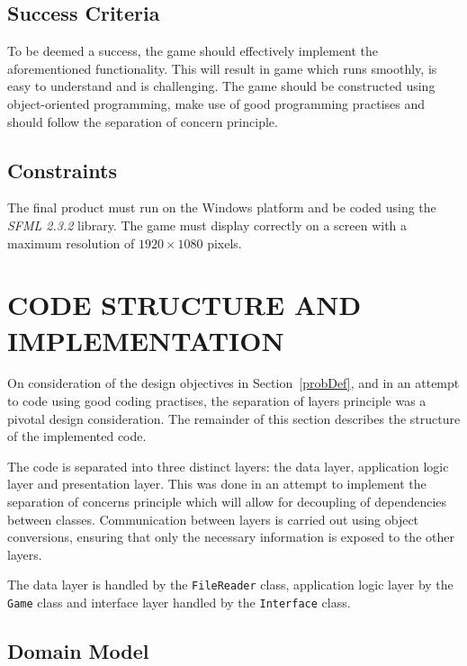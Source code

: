 \documentclass[10pt,twocolumn]{witseiepaper}
\begin{document}
\subsection{Success Criteria}

To be deemed a success, the game should effectively implement the aforementioned functionality. This will result in game which runs smoothly, is easy to understand and is challenging. The game should be constructed using object-oriented programming, make use of good programming practises and should follow the separation of concern principle. 

\subsection{Constraints}

The final product must run on the Windows platform and be coded using the \textit{SFML 2.3.2} library. The game must display correctly on a screen with a maximum resolution of $1920 \times 1080$ pixels.

\section{CODE STRUCTURE AND IMPLEMENTATION}

On consideration of the design objectives in Section~\ref{probDef}, and in an attempt to code using good coding practises, the separation of layers principle was a pivotal design consideration. The remainder of this section describes the structure of the implemented code.

The code is separated into three distinct layers: the data layer, application logic layer and presentation layer. This was done in an attempt to implement the separation of concerns principle which will allow for decoupling of dependencies between classes. Communication between layers is carried out using object conversions, ensuring that only the necessary information is exposed to the other layers.

The data layer is handled by the \texttt{FileReader} class, application logic layer by the \texttt{Game} class and interface layer handled by the \texttt{Interface} class.

\subsection{Domain Model}
\end{document}
